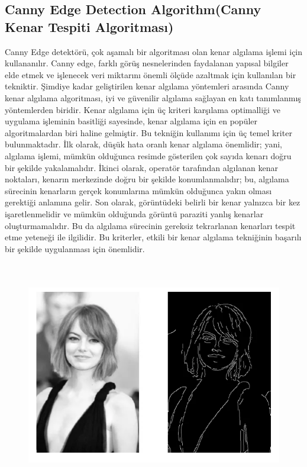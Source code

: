 \documentclass[12pt]{article}
\begin{document}
\subsection{Canny Edge Detection Algorithm(Canny Kenar Tespiti Algoritması)}
Canny Edge detektörü, çok aşamalı bir algoritması olan kenar algılama işlemi için kullananılır. Canny edge, farklı görüş nesnelerinden faydalanan yapısal bilgiler elde etmek ve işlenecek veri miktarını önemli ölçüde azaltmak için kullanılan bir tekniktir. Şimdiye kadar geliştirilen kenar algılama yöntemleri arasında Canny kenar algılama algoritması, iyi ve güvenilir algılama sağlayan en katı tanımlanmış yöntemlerden biridir. Kenar algılama için üç kriteri karşılama optimalliği ve uygulama işleminin basitliği sayesinde, kenar algılama için en popüler algoritmalardan biri haline gelmiştir.
Bu tekniğin kullanımı için üç temel kriter bulunmaktadır. İlk olarak, düşük hata oranlı kenar algılama önemlidir; yani, algılama işlemi, mümkün olduğunca resimde gösterilen çok sayıda kenarı doğru bir şekilde yakalamalıdır. İkinci olarak, operatör tarafından algılanan kenar noktaları, kenarın merkezinde doğru bir şekilde konumlanmalıdır; bu, algılama sürecinin kenarların gerçek konumlarına mümkün olduğunca yakın olması gerektiği anlamına gelir. Son olarak, görüntüdeki belirli bir kenar yalnızca bir kez işaretlenmelidir ve mümkün olduğunda görüntü paraziti yanlış   kenarlar oluşturmamalıdır. Bu da algılama sürecinin gereksiz tekrarlanan kenarları tespit etme yeteneği ile ilgilidir. Bu kriterler, etkili bir kenar algılama tekniğinin başarılı bir şekilde uygulanması için önemlidir.
\begin{figure}[h]
    \centering
    \includegraphics[width=7\textwidth, height=10cm, keepaspectratio]{canny.png}
    \label{fig:enter-label}
\end{figure}
\end{document}
